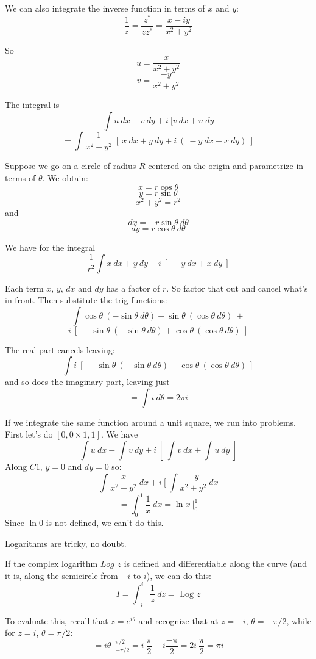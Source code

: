 \documentclass[11pt, oneside]{article}
\begin{document}
We can also integrate the inverse function in terms of $x$ and $y$:
\[ \frac{1}{z} = \frac{z^*}{zz^*} = \frac{x - iy}{x^2 + y^2} \]

So
\[ u = \frac{x}{x^2 + y^2} \]
\[ v =  \frac{-y}{x^2 + y^2} \]

The integral is
\[ \int u \ dx - v \ dy + i \ [ v \ dx + u \ dy \] 
\[ = \int \frac{1}{x^2+y^2} \ [ \  x \ dx + y \ dy + i \ ( \ -y \ dx + x \ dy) \ ] \]

Suppose we go on a circle of radius $R$ centered on the origin and parametrize in terms of $\theta$.  We obtain:
\[ x = r \cos \theta \]
\[ y = r \sin \theta \]
\[ x^2 + y^2 = r^2 \]
and
\[ dx = - r \sin \theta \ d \theta \]
\[ dy = r \cos \theta \ d \theta \]

We have for the integral
\[ \frac{1}{r^2} \int x \ dx + y \ dy + i \ [ \ -y \ dx + x \ dy \ ] \]

Each term $x$, $y$, $dx$ and $dy$ has a factor of $r$.  So factor that out and cancel what's in front.  Then substitute the trig functions:
\[ \int \cos \theta \ (- \sin \theta \ d \theta) + \sin \theta \ (\cos \theta \ d \theta)\  + \]
\[ i \ [ \ - \sin \theta \ (- \sin \theta \ d \theta) + \cos \theta \ (\cos \theta \ d \theta)\ ] \]

The real part cancels leaving:
\[ \int   i \ [ \ - \sin \theta \ (- \sin \theta \ d \theta) + \cos \theta \ (\cos \theta \ d \theta)\ ]\]
and so does the imaginary part, leaving just
\[ = \int i \ d \theta = 2 \pi i \]

If we integrate the same function around a unit square, we run into problems.  First let's  do $[0,0 \times 1,1]$.  We have
\[ \int u \ dx - \int v \ dy + i \ [ \ \int v \ dx + \int u \ dy \ ]  \]
Along $C1$, $y = 0$ and $dy = 0$ so:
\[ \int \frac{x}{x^2 + y^2} \ dx + i \ [ \ \int \frac{-y}{x^2 + y^2} \ dx \]
\[ = \int_0^1 \frac{1}{x} \ dx = \ln x \ \bigg |_0^1 \]
Since $\ln 0$ is not defined, we can't do this.

Logarithms are tricky, no doubt.  

If the complex logarithm $Log$ $z$ is defined and differentiable along the curve (and it is, along the semicircle from $-i$ to $i$), we can do this:
\[ I = \int_{-i}^i \frac{1}{z} \ dz = \text{ Log } z  \]

To evaluate this, recall that $z = e^{i\theta}$ and recognize that at $z = -i$, $\theta = - \pi/2$, while for $z = i$, $\theta = \pi/2$:
\[ = i \theta \ \bigg |_{-\pi/2}^{\pi/2} =  i \ \frac{\pi}{2}  -  i \frac{-\pi}{2}  = 2i \ \frac{\pi}{2} = \pi i \]
\end{document}

